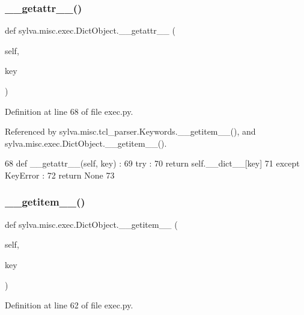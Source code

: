\subsubsection{\texorpdfstring{\+\_\+\+\_\+getattr\+\_\+\+\_\+()}{\_\_getattr\_\_()}}
{\footnotesize\ttfamily def sylva.\+misc.\+exec.\+Dict\+Object.\+\_\+\+\_\+getattr\+\_\+\+\_\+ (\begin{DoxyParamCaption}\item[{}]{self,  }\item[{}]{key }\end{DoxyParamCaption})}



Definition at line 68 of file exec.\+py.



Referenced by sylva.\+misc.\+tcl\+\_\+parser.\+Keywords.\+\_\+\+\_\+getitem\+\_\+\+\_\+(), and sylva.\+misc.\+exec.\+Dict\+Object.\+\_\+\+\_\+getitem\+\_\+\+\_\+().


\begin{DoxyCode}
68   \textcolor{keyword}{def }\_\_getattr\_\_(self, key) :
69     \textcolor{keywordflow}{try} :
70       \textcolor{keywordflow}{return} self.\_\_dict\_\_[key]
71     \textcolor{keywordflow}{except} KeyError :
72       \textcolor{keywordflow}{return} \textcolor{keywordtype}{None}
73 
\end{DoxyCode}
\mbox{\label{classsylva_1_1misc_1_1exec_1_1_dict_object_ab360685e86a5d323b99adcde29546ebb}} 
\subsubsection{\texorpdfstring{\+\_\+\+\_\+getitem\+\_\+\+\_\+()}{\_\_getitem\_\_()}}
{\footnotesize\ttfamily def sylva.\+misc.\+exec.\+Dict\+Object.\+\_\+\+\_\+getitem\+\_\+\+\_\+ (\begin{DoxyParamCaption}\item[{}]{self,  }\item[{}]{key }\end{DoxyParamCaption})}



Definition at line 62 of file exec.\+py.



